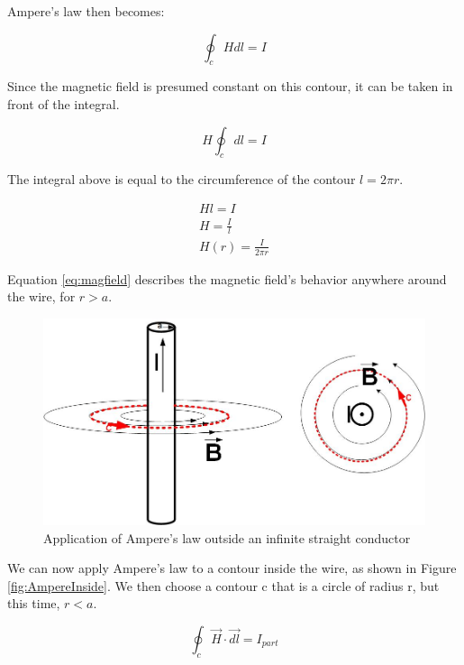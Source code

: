 \documentclass{ximera}
\begin{document}
\begin{example}
\begin{explanation}
Ampere's law then becomes:


\begin{equation}
\oint_c H dl = I
\end{equation}
 
Since the magnetic field is presumed constant on this contour, it can be taken in front of the integral.


\begin{equation}
H \oint_c  dl = I
\end{equation}

The integral above is equal to the circumference of the contour $l=2 \pi r$.

\begin{eqnarray}
H l = I \\
H=\frac{I}{l} \\
H(r)=\frac{I}{2 \pi r} \label{eq:magfield}
\end{eqnarray}

Equation \ref{eq:magfield} describes the magnetic field's behavior anywhere around the wire, for $r > a$.


\begin{figure}
\begin{center}
\includegraphics[scale=0.4]{../jpg/AmperesLaw1.jpg}
\end{center}
\caption{ Application of Ampere's law outside an infinite straight conductor}
\label{fig:AmpereOutside}
\end{figure}


We can now apply Ampere's law to a contour inside the wire, as shown in Figure \ref{fig:AmpereInside}. 
We then choose a contour c that is a circle of radius r, but this time, $r<a$. 




\begin{equation}
\oint_c \vec{H} \cdot \vec{dl} = I_{part}
\end{equation}



\end{explanation}
\end{example}
\end{document}

